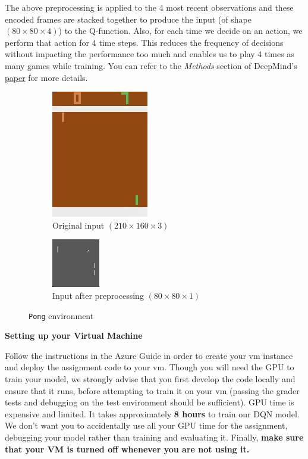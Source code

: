 The above preprocessing is applied to the 4 most recent observations and these encoded frames are stacked together to produce the input (of shape $(80 \times 80 \times 4)$) to the Q-function. Also, for each time we decide on an action, we perform that action for 4 time steps. This reduces the frequency of decisions without impacting the performance too much and enables us to play 4 times as many games while training. You can refer to the \textit{Methods} section of DeepMind's \href{https://storage.googleapis.com/deepmind-media/dqn/DQNNaturePaper.pdf}{paper} for more details. \\

\begin{figure}[H]
\centering
\begin{subfigure}[b]{.4\textwidth}
  \centering
  \includegraphics[width=.25\linewidth]{images/pong}
  \caption{Original input $ (210 \times 160 \times 3)$ }
  \label{fig:pong}
\end{subfigure}
\begin{subfigure}[b]{.4\textwidth}
  \centering
  \includegraphics[width=.25\linewidth]{images/pong_grey}
  \caption{Input after preprocessing $ (80 \times 80 \times 1 ) $}
  \label{fig:pong_grey}
\end{subfigure}
\caption{\texttt{Pong} environment}
\label{fig:pong_env}
\end{figure}

\textbf{Setting up your Virtual Machine}

Follow the instructions in the Azure Guide in order to create your vm instance and deploy the assignment code to your vm. Though you will need the GPU to train your model, we strongly advise that you first develop the code locally and ensure that it runs, before attempting to train it on your vm (passing the grader tests and debugging on the test environment should be sufficient). GPU time is expensive and limited. It takes approximately \textbf{8 hours} to train our DQN model. We don't want you to accidentally use all your GPU time for the assignment, debugging your model rather than training and evaluating it. Finally, \textbf{make sure that your VM is turned off whenever you are not using it.}

